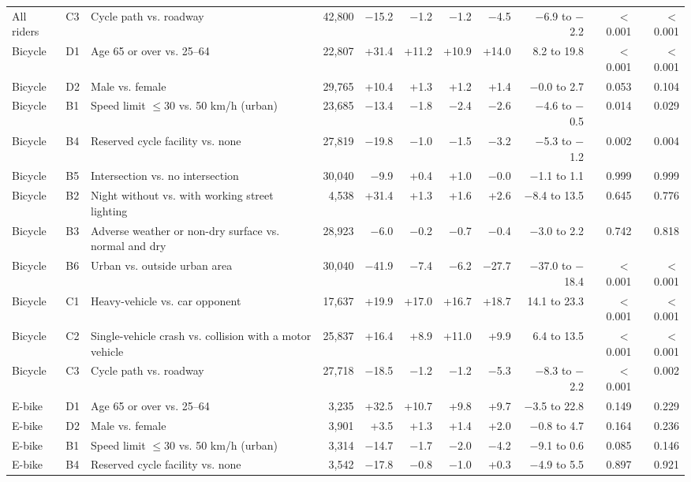 \begin{table}[tp]
\begin{threeparttable}
{\begin{tabular}{llp{4.4cm}rrrrrrrr}
All riders & C3 & Cycle path vs. roadway & 42,800 & $-$15.2 & $-$1.2 & $-$1.2 & $-$4.5 & $-$6.9 to $-$2.2 & $<$0.001 & $<$0.001 \\
Bicycle & D1 & Age 65 or over vs. 25–64 & 22,807 & +31.4 & +11.2 & +10.9 & +14.0 & 8.2 to 19.8 & $<$0.001 & $<$0.001 \\
Bicycle & D2 & Male vs. female & 29,765 & +10.4 & +1.3 & +1.2 & +1.4 & $-$0.0 to 2.7 & 0.053 & 0.104 \\
Bicycle & B1 & Speed limit $\leq$30 vs. 50 km/h (urban) & 23,685 & $-$13.4 & $-$1.8 & $-$2.4 & $-$2.6 & $-$4.6 to $-$0.5 & 0.014 & 0.029 \\
Bicycle & B4 & Reserved cycle facility vs. none & 27,819 & $-$19.8 & $-$1.0 & $-$1.5 & $-$3.2 & $-$5.3 to $-$1.2 & 0.002 & 0.004 \\
Bicycle & B5 & Intersection vs. no intersection & 30,040 & $-$9.9 & +0.4 & +1.0 & $-$0.0 & $-$1.1 to 1.1 & 0.999 & 0.999 \\
Bicycle & B2 & Night without vs. with working street lighting & 4,538 & +31.4 & +1.3 & +1.6 & +2.6 & $-$8.4 to 13.5 & 0.645 & 0.776 \\
Bicycle & B3 & Adverse weather or non-dry surface vs. normal and dry & 28,923 & $-$6.0 & $-$0.2 & $-$0.7 & $-$0.4 & $-$3.0 to 2.2 & 0.742 & 0.818 \\
Bicycle & B6 & Urban vs. outside urban area & 30,040 & $-$41.9 & $-$7.4 & $-$6.2 & $-$27.7 & $-$37.0 to $-$18.4 & $<$0.001 & $<$0.001 \\
Bicycle & C1 & Heavy-vehicle vs. car opponent & 17,637 & +19.9 & +17.0 & +16.7 & +18.7 & 14.1 to 23.3 & $<$0.001 & $<$0.001 \\
Bicycle & C2 & Single-vehicle crash vs. collision with a motor vehicle & 25,837 & +16.4 & +8.9 & +11.0 & +9.9 & 6.4 to 13.5 & $<$0.001 & $<$0.001 \\
Bicycle & C3 & Cycle path vs. roadway & 27,718 & $-$18.5 & $-$1.2 & $-$1.2 & $-$5.3 & $-$8.3 to $-$2.2 & $<$0.001 & 0.002 \\
E-bike & D1 & Age 65 or over vs. 25–64 & 3,235 & +32.5 & +10.7 & +9.8 & +9.7 & $-$3.5 to 22.8 & 0.149 & 0.229 \\
E-bike & D2 & Male vs. female & 3,901 & +3.5 & +1.3 & +1.4 & +2.0 & $-$0.8 to 4.7 & 0.164 & 0.236 \\
E-bike & B1 & Speed limit $\leq$30 vs. 50 km/h (urban) & 3,314 & $-$14.7 & $-$1.7 & $-$2.0 & $-$4.2 & $-$9.1 to 0.6 & 0.085 & 0.146 \\
E-bike & B4 & Reserved cycle facility vs. none & 3,542 & $-$17.8 & $-$0.8 & $-$1.0 & +0.3 & $-$4.9 to 5.5 & 0.897 & 0.921 \\

\end{tabular}}
\end{threeparttable}
\end{table}
